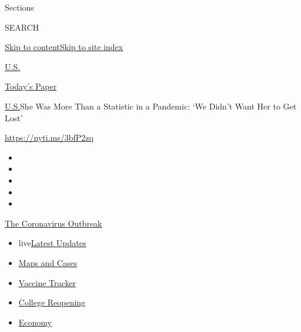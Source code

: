 Sections

SEARCH

\protect\hyperlink{site-content}{Skip to
content}\protect\hyperlink{site-index}{Skip to site index}

\href{https://www.nytimes.com/section/us}{U.S.}

\href{https://myaccount.nytimes.com/auth/login?response_type=cookie\&client_id=vi}{}

\href{https://www.nytimes.com/section/todayspaper}{Today's Paper}

\href{/section/us}{U.S.}\textbar{}She Was More Than a Statistic in a
Pandemic: `We Didn't Want Her to Get Lost'

\url{https://nyti.ms/3bfP2zq}

\begin{itemize}
\item
\item
\item
\item
\item
\end{itemize}

\href{https://www.nytimes.com/news-event/coronavirus?action=click\&pgtype=Article\&state=default\&region=TOP_BANNER\&context=storylines_menu}{The
Coronavirus Outbreak}

\begin{itemize}
\tightlist
\item
  live\href{https://www.nytimes.com/2020/08/03/world/coronavirus-covid-19.html?action=click\&pgtype=Article\&state=default\&region=TOP_BANNER\&context=storylines_menu}{Latest
  Updates}
\item
  \href{https://www.nytimes.com/interactive/2020/us/coronavirus-us-cases.html?action=click\&pgtype=Article\&state=default\&region=TOP_BANNER\&context=storylines_menu}{Maps
  and Cases}
\item
  \href{https://www.nytimes.com/interactive/2020/science/coronavirus-vaccine-tracker.html?action=click\&pgtype=Article\&state=default\&region=TOP_BANNER\&context=storylines_menu}{Vaccine
  Tracker}
\item
  \href{https://www.nytimes.com/2020/08/02/us/covid-college-reopening.html?action=click\&pgtype=Article\&state=default\&region=TOP_BANNER\&context=storylines_menu}{College
  Reopening}
\item
  \href{https://www.nytimes.com/live/2020/08/03/business/stock-market-today-coronavirus?action=click\&pgtype=Article\&state=default\&region=TOP_BANNER\&context=storylines_menu}{Economy}
\end{itemize}

